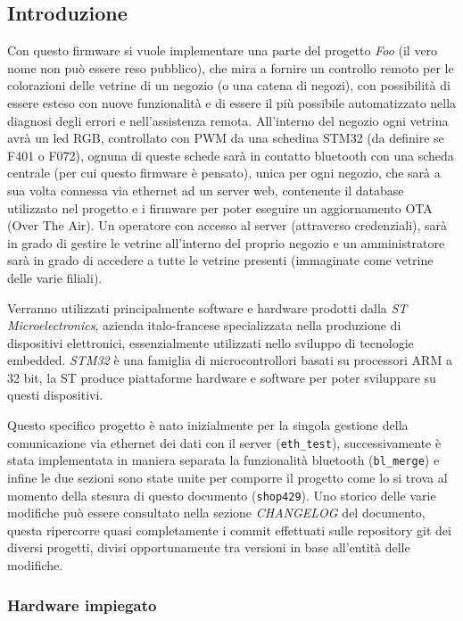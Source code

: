 \subsection{Introduzione}

Con questo firmware si vuole implementare una parte del progetto \textit{Foo} (il vero nome non pu\`o essere reso pubblico), che mira a fornire un controllo remoto per le colorazioni delle vetrine di un negozio (o una catena di negozi), con possibilit\`a di essere esteso con nuove funzionalit\`a e di essere il pi\`u possibile automatizzato nella diagnosi degli errori e nell'assistenza remota. All'interno del negozio ogni vetrina avr\`a un led RGB, controllato con PWM da una schedina STM32 (da definire se F401 o F072), ognuna di queste schede sar\`a in contatto bluetooth con una scheda centrale (per cui questo firmware \`e pensato), unica per ogni negozio, che sar\`a a sua volta connessa via ethernet ad un server web, contenente il database utilizzato nel progetto e i firmware per poter eseguire un aggiornamento OTA (Over The Air). Un operatore con accesso al server (attraverso credenziali), sar\`a in grado di gestire le vetrine all'interno del proprio negozio e un amministratore sar\`a in grado di accedere a tutte le vetrine presenti (immaginate come vetrine delle varie filiali).

Verranno utilizzati principalmente software e hardware prodotti dalla \textit{ST Microelectronics}, azienda italo-francese specializzata nella produzione di dispositivi elettronici, essenzialmente utilizzati nello sviluppo di tecnologie embedded. \textit{STM32} \`e una famiglia di microcontrollori basati su processori ARM a 32 bit, la ST produce piattaforme hardware e software per poter sviluppare su questi dispositivi.

Questo specifico progetto \`e nato inizialmente per la singola gestione della comunicazione via ethernet dei dati con il server (\texttt{eth\_test}), successivamente \`e stata implementata in maniera separata la funzionalit\`a bluetooth (\texttt{bl\_merge}) e infine le due sezioni sono state unite per comporre il progetto come lo si trova al momento della stesura di questo documento (\texttt{shop429}). Uno storico delle varie modifiche pu\`o essere consultato nella sezione \textit{CHANGELOG} del documento, questa ripercorre quasi completamente i commit effettuati sulle repository git dei diversi progetti, divisi opportunamente tra versioni in base all'entit\`a delle modifiche.

\subsubsection{Hardware impiegato}

